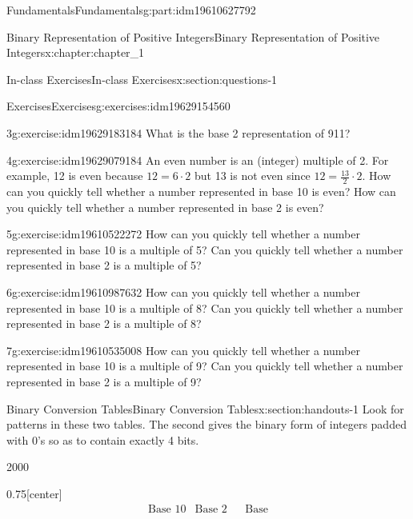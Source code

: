 \documentclass[oneside,10pt,]{book}
\numberwithin{equation}{section}
\begin{document}
\begin{partptx}{Fundamentals}{}{Fundamentals}{}{}{g:part:idm19610627792}
\begin{chapterptx}{Binary Representation of Positive Integers}{}{Binary Representation of Positive Integers}{}{}{x:chapter:chapter_1}
\begin{sectionptx}{In-class Exercises}{}{In-class Exercises}{}{}{x:section:questions-1}
\begin{exercises-subsection-numberless}{Exercises}{}{Exercises}{}{}{g:exercises:idm19629154560}
\begin{exercisegroup}
\begin{divisionexerciseeg}{3}{}{}{g:exercise:idm19629183184}
What is the base 2 representation of 911?%
\end{divisionexerciseeg}%
\begin{divisionexerciseeg}{4}{}{}{g:exercise:idm19629079184}%
An even number is an (integer) multiple of 2.  For example, 12 is even because \(12 = 6 \cdot 2\) but 13 is not even since \(12 = \frac{13}{2} \cdot 2\).  How can you quickly tell whether a number represented in base 10  is even?  How can you quickly tell whether a number represented in base 2  is even?%
\end{divisionexerciseeg}%
\begin{divisionexerciseeg}{5}{}{}{g:exercise:idm19610522272}%
How can you quickly tell whether a number represented in base 10  is a multiple of 5?  Can you quickly tell whether a number represented in base 2  is a multiple of 5?%
\end{divisionexerciseeg}%
\begin{divisionexerciseeg}{6}{}{}{g:exercise:idm19610987632}%
How can you quickly tell whether a number represented in base 10  is a multiple of 8? Can you quickly tell whether a number represented in base 2  is a multiple of 8?%
\end{divisionexerciseeg}%
\begin{divisionexerciseeg}{7}{}{}{g:exercise:idm19610535008}%
How can you quickly tell whether a number represented in base 10  is a multiple of 9?  Can you quickly tell whether a number represented in base 2  is a multiple of 9?%
\end{divisionexerciseeg}%
\end{exercisegroup}
\par\medskip\noindent
\end{exercises-subsection-numberless}
\end{sectionptx}
%
%
\typeout{************************************************}
\typeout{************************************************}
%
\begin{sectionptx}{Binary Conversion Tables}{}{Binary Conversion Tables}{}{}{x:section:handouts-1}
Look for patterns in these two tables. The second gives the binary form of integers padded with 0's so as to contain exactly 4 bits.%
\begin{sidebyside}{2}{0}{0}{0}%
\begin{sbspanel}{0.75}[center]%
%
\begin{equation*}
\begin{array}{ccccc}
\text{Base 10} & \text{Base
2} & \text{} & \text{Base
}
\end{array}
\end{equation*}
\end{sbspanel}
\end{sidebyside}
\end{sectionptx}
\end{chapterptx}
\end{partptx}
\end{document}
